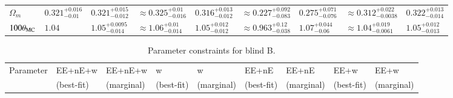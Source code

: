 \begin{appendix}
\begin{landscape}
\begin{table}
\begin{center}
\begin{tabular}{lllllllll}
$\Omega_m$& $0.321^{+0.016}_{-0.01}$ & $0.321^{+0.015}_{-0.012}$& $\approx 0.325^{+0.01}_{-0.016}$ & $0.316^{+0.013}_{-0.012}$& $\approx 0.227^{+0.092}_{-0.083}$ & $0.275^{+0.071}_{-0.076}$& $\approx 0.312^{+0.022}_{-0.0038}$ & $0.322^{+0.013}_{-0.014}$\\
$100\theta_{\rm MC}$& $1.04$ & $1.05^{+0.0095}_{-0.014}$& $\approx 1.06^{+0.01}_{-0.014}$ & $1.05^{+0.012}_{-0.012}$& $\approx 0.963^{+0.12}_{-0.038}$ & $1.07^{+0.044}_{-0.06}$& $\approx 1.04^{+0.019}_{-0.0061}$ & $1.05^{+0.012}_{-0.013}$\\
    \bottomrule
\end{tabular}
\end{center}
\end{table}
\end{landscape}


\begin{landscape}
\begin{table}
\begin{center}
\caption{Parameter constraints for blind B. }
\begin{tabular}{lllllllll}
    \toprule
    Parameter    & EE+nE+w & EE+nE+w& w & w& EE+nE & EE+nE& EE+w & EE+w \\ 
             & (best-fit) & (marginal)& (best-fit) & (marginal)& (best-fit) & (marginal)& (best-fit) & (marginal) \\ 


\end{tabular}
\end{center}
\end{table}
\end{landscape}
\end{appendix}
